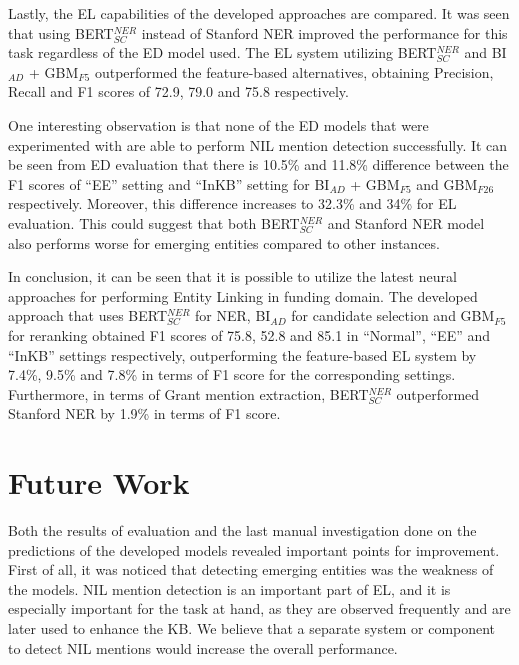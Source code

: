 \documentclass{report}
\theoremstyle{definition}
\theoremstyle{remark}
\begin{document}
Lastly, the EL capabilities of the developed approaches are compared. It was seen that using BERT$^{NER}_{SC}$ instead of Stanford NER improved the performance for this task regardless of the ED model used. The EL system utilizing BERT$^{NER}_{SC}$ and BI$_{AD}$ + GBM$_{F5}$ outperformed the feature-based alternatives, obtaining Precision, Recall and F1 scores of 72.9, 79.0 and 75.8 respectively.

One interesting observation is that none of the ED models that were experimented with are able to perform NIL mention detection successfully. It can be seen from ED evaluation that there is 10.5\% and 11.8\% difference between the F1 scores of ``EE'' setting and ``InKB'' setting for BI$_{AD}$ + GBM$_{F5}$ and GBM$_{F26}$ respectively. Moreover, this difference increases to 32.3\% and 34\% for EL evaluation. This could suggest that both BERT$^{NER}_{SC}$ and Stanford NER model also performs worse for emerging entities compared to other instances.

In conclusion, it can be seen that it is possible to utilize the latest neural approaches for performing Entity Linking in funding domain. The developed approach that uses BERT$^{NER}_{SC}$ for NER, BI$_{AD}$ for candidate selection and GBM$_{F5}$ for reranking obtained F1 scores of 75.8, 52.8 and 85.1 in ``Normal'', ``EE'' and ``InKB'' settings  respectively, outperforming the feature-based EL system by 7.4\%, 9.5\% and 7.8\% in terms of F1 score for the corresponding settings. Furthermore, in terms of Grant mention extraction, BERT$^{NER}_{SC}$ outperformed Stanford NER by 1.9\% in terms of F1 score.

\section{Future Work}

Both the results of evaluation and the last manual investigation done on the predictions of the developed models revealed important points for improvement. First of all, it was noticed that detecting emerging entities was the weakness of the models. NIL mention detection is an important part of EL, and it is especially important for the task at hand, as they are observed frequently and are later used to enhance the KB. We believe that a separate system or component to detect NIL mentions would increase the overall performance.
\end{document}
